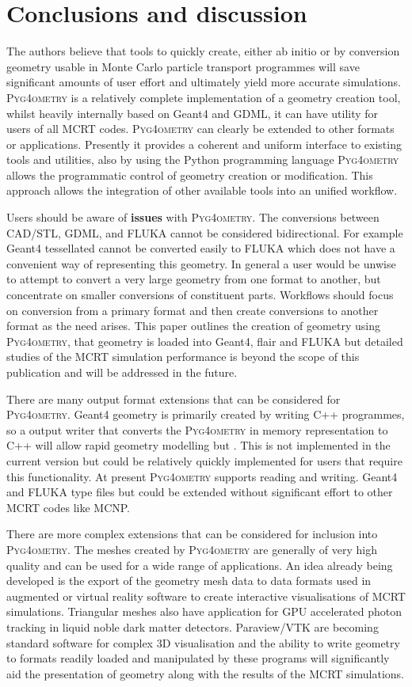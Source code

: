 \documentclass[final,5p,times,twocolumn]{elsarticle}
\newcommand{\PYGEOMETRY}{\textsc{Pyg4ometry}}
\begin{document}
\section{Conclusions and discussion}
The authors believe that tools to quickly create, either ab initio or by conversion geometry usable in Monte Carlo
particle transport programmes will save significant amounts of user effort and ultimately 
yield more accurate simulations. \PYGEOMETRY{} is a relatively complete implementation of a geometry 
creation tool, whilst heavily internally based on Geant4 and GDML, it can have utility for users of all MCRT 
codes. \PYGEOMETRY{} can clearly be extended to other formats or applications. Presently it provides a coherent and 
uniform interface to existing tools and utilities, also by using the Python programming language \PYGEOMETRY{} 
allows the programmatic control of geometry creation or modification. This approach allows the integration of 
other available tools \cite{DavisNIMA915-65} into an unified workflow.

Users should be aware of {\bf issues} with \PYGEOMETRY{}. The conversions between CAD/STL, GDML, and FLUKA 
cannot be considered bidirectional. For example Geant4 tessellated cannot be converted easily to FLUKA which does not 
have a convenient way of representing this geometry. In general a user would be unwise to attempt to convert a very large 
geometry from one format to another, but concentrate on smaller conversions of constituent parts. Workflows should focus 
on conversion from a primary format and then create conversions to another format as the need arises. This paper outlines 
the creation of geometry using \PYGEOMETRY{}, that geometry is loaded into Geant4, flair and FLUKA but detailed 
studies of the MCRT simulation performance is beyond the scope of this publication and will be addressed in the future.

There are many output format extensions that can be considered for \PYGEOMETRY{}. 
Geant4 geometry is primarily created by writing C++ programmes, so a output writer that 
converts the \PYGEOMETRY{} in memory representation to C++ will allow rapid geometry 
modelling but . This is not implemented in the current version but could be relatively quickly implemented
for users that require this functionality. At present \PYGEOMETRY{} supports reading and writing. 
Geant4 and FLUKA type files but could be extended without significant effort to other MCRT codes 
like MCNP. 

There are more complex extensions that can be considered for inclusion into \PYGEOMETRY{}.
The meshes created by \PYGEOMETRY{} are generally of very high quality and can be used for a 
wide range of applications. An idea already being developed is the export of the geometry mesh data to
data formats used in augmented or virtual reality software to create interactive visualisations of MCRT 
simulations.  Triangular meshes also have application  for GPU accelerated photon tracking in 
liquid noble dark matter detectors. Paraview/VTK are becoming standard software for complex 3D visualisation and 
the ability to write geometry to formats readily loaded and manipulated by these programs will 
significantly aid the presentation of geometry along with the results of the MCRT simulations.
\end{document}
